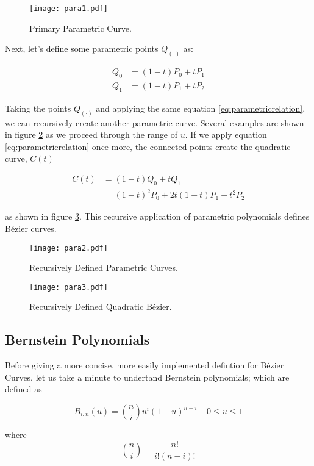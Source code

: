 \begin{figure}[htbp]
	\centering
	\texttt{[image: para1.pdf]}
	\caption{Primary Parametric Curve.}
	\label{fig:para1}
\end{figure}

Next, let's define some parametric points $Q_{(\cdot)}$ as:

\begin{align}
Q_0 &=  (1-t)P_0 + tP_1 \\
Q_1 &=  (1-t)P_1 + tP_2
 \end{align} 
 
Taking the points $Q_{(\cdot)}$ and applying the same equation \ref{eq:parametricrelation}, we can recursively create another parametric curve. Several examples are shown in figure \ref{fig:para2} as we proceed through the range of $u$. If we apply equation \ref{eq:parametricrelation} once more, the connected points create the quadratic curve, $C(t)$

\begin{align}
C(t) &= (1-t)Q_0 + tQ_1 \\
&= (1-t)^2P_0 + 2t(1-t)P_1+t^2P_2 
\end{align} 

as shown in figure \ref{fig:para3}. This recursive application of parametric polynomials defines Bézier curves.
 
 \begin{figure}[htbp]
 	\centering
 	\texttt{[image: para2.pdf]}
 	\caption{Recursively Defined Parametric Curves.}
 	\label{fig:para2}
 \end{figure}

 
\begin{figure}[htbp]
	\centering
	\texttt{[image: para3.pdf]}
	\caption{Recursively Defined Quadratic Bézier.}
	\label{fig:para3}
\end{figure}


\subsection{Bernstein Polynomials}
Before giving a more concise, more easily implemented defintion for Bézier Curves, let us take a minute to undertand Bernstein polynomials; which are defined as

\begin{equation} B_{i,n}(u) = {n\choose i} u^i (1-u)^{n-i} ~~~~~0\leq u \leq1 \end{equation}

where \begin{equation} {n\choose i} = \frac{n!}{i!(n-i)!} \end{equation} 

